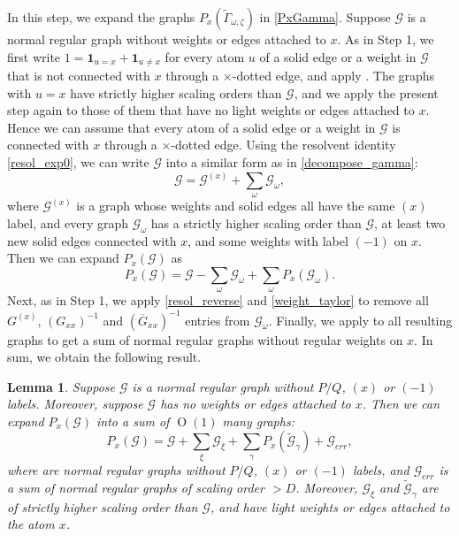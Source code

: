 \documentclass{article}
\newcommand{\1}{\mathds{1}}
\numberwithin{equation}{section}
\renewcommand{\cal}{\mathcal}
\newcommand{\wt}{\widetilde}
\DeclareMathOperator{\OO}{O}
\theoremstyle{plain} %
\newtheorem{lemma}[theorem]{Lemma}
\theoremstyle{remark}
\begin{document}
\medskip
{} In this step, we expand the graphs $P_x(\wt \Gamma_{\omega,\zeta})$ in \eqref{PxGamma}. Suppose $\cal G$ is a normal regular graph without weights or edges attached to $x$. As in Step 1, we first write $1=\mathbf 1_{u=x}+\mathbf 1_{u\ne x}$ for every atom $u$ of a solid edge or a weight in $\cal G$ that is not connected with $x$ through a $\times$-dotted edge, and apply \smash{${\cal O}^{(x),1}_{weight} \circ\cal O_{dot}$}. The graphs with $u=x$ have strictly higher scaling orders than $\cal G$, and we apply the present step again to those of them that have no light weights or edges attached to $x$. Hence we can assume that every atom of a solid edge or a weight in $\cal G$ is connected with $x$ through a $\times$-dotted edge. Using the resolvent identity \eqref{resol_exp0}, we can write $\cal G$ into a similar form as in \eqref{decompose_gamma}:
$$\cal G = \cal G^{(x)} + \sum_\omega \cal G_{\omega},$$
where $\cal G^{(x)}$ is a graph whose weights and solid edges all have the same $(x)$ label, and every graph $\cal G_{\omega}$ has a strictly higher scaling order than $\cal G$, at least two new solid edges connected with $x$, and some weights with label $(-1)$ on $x$. Then we can expand $P_x(\cal G)$ as 
$$P_x(\cal G) = \cal G- \sum_\omega \cal G_{\omega} + \sum_\omega P_x(\cal G_{\omega}).$$
Next, as in Step 1, we apply \eqref{resol_reverse} and \eqref{weight_taylor} to remove all $G^{(x)}$, $(G_{xx})^{-1}$ and $(\overline G_{xx})^{-1}$ entries from $\cal G_{\omega}$. Finally, we apply \smash{${\cal O}^{(x),1}_{weight} \circ\cal O_{dot}$} to all resulting graphs to get a sum of normal regular graphs without regular weights on $x$. In sum, we obtain the following result. 

\begin{lemma}\label{Q_lemma3}
Suppose $\cal G$ is a normal regular graph without $P/Q$, $(x)$ or $(-1)$ labels. Moreover, suppose $\cal G$ has no weights or edges attached to $x$. Then we can expand $P_x(\cal G)$ into a sum of $\OO(1)$ many graphs: 
$$P_x(\cal G) = \cal G+ \sum_\xi  \cal G_{\xi}  + \sum_\gamma  P_x(\wt{\cal G}_{\gamma}) + \cal G_{err},$$
where \smash{$\cal G_{\xi}$ and $\wt{\cal G}_{\gamma}$} are normal regular graphs without $P/Q$, $(x)$ or $(-1)$ labels, and $\cal G_{err}$ is a sum of normal regular graphs of scaling order $>D$. Moreover, $\cal G_\xi$ and $\wt{\cal G}_{\gamma}$ are of strictly higher scaling order than $\cal G$, and have light weights or edges attached to the atom $x$.
\end{lemma}
\end{document}

